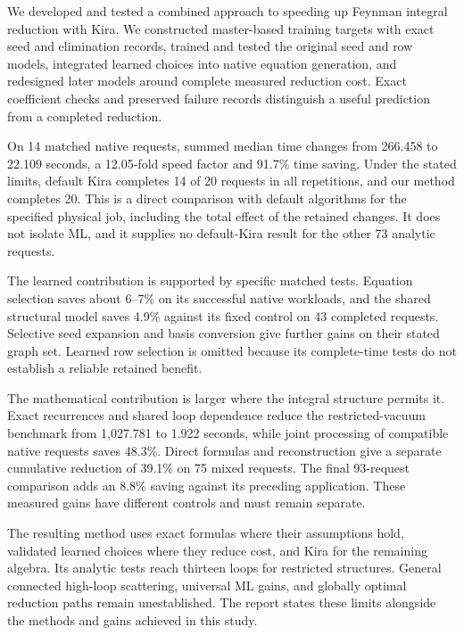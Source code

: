 We developed and tested a combined approach to speeding up Feynman integral reduction with Kira. We constructed master-based training targets with exact seed and elimination records, trained and tested the original seed and row models, integrated learned choices into native equation generation, and redesigned later models around complete measured reduction cost. Exact coefficient checks and preserved failure records distinguish a useful prediction from a completed reduction.

On 14 matched native requests, summed median time changes from 266.458 to 22.109 seconds, a 12.05-fold speed factor and 91.7\% time saving. Under the stated limits, default Kira completes 14 of 20 requests in all repetitions, and our method completes 20. This is a direct comparison with default algorithms for the specified physical job, including the total effect of the retained changes. It does not isolate ML, and it supplies no default-Kira result for the other 73 analytic requests.

The learned contribution is supported by specific matched tests. Equation selection saves about 6--7\% on its successful native workloads, and the shared structural model saves 4.9\% against its fixed control on 43 completed requests. Selective seed expansion and basis conversion give further gains on their stated graph set. Learned row selection is omitted because its complete-time tests do not establish a reliable retained benefit.

The mathematical contribution is larger where the integral structure permits it. Exact recurrences and shared loop dependence reduce the restricted-vacuum benchmark from 1,027.781 to 1.922 seconds, while joint processing of compatible native requests saves 48.3\%. Direct formulas and reconstruction give a separate cumulative reduction of 39.1\% on 75 mixed requests. The final 93-request comparison adds an 8.8\% saving against its preceding application. These measured gains have different controls and must remain separate.

The resulting method uses exact formulas where their assumptions hold, validated learned choices where they reduce cost, and Kira for the remaining algebra. Its analytic tests reach thirteen loops for restricted structures. General connected high-loop scattering, universal ML gains, and globally optimal reduction paths remain unestablished. The report states these limits alongside the methods and gains achieved in this study.
